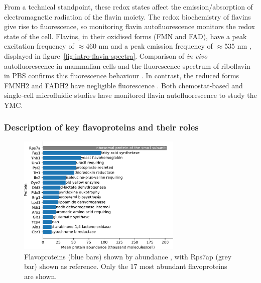 From a technical standpoint, these redox states affect the emission/absorption of electromagnetic radiation of the flavin moiety.
The redox biochemistry of flavins give rise to fluorescence, so monitoring flavin autofluorescence monitors the redox state of the cell.
Flavins, in their oxidised forms (FMN and FAD), have a peak excitation frequency of $\approx$460 nm and a peak emission frequency of $\approx$535 nm \parencite{maslankaAutofluorescenceYeastSaccharomyces2018, wagnieresVivoFluorescenceSpectroscopy1998}, displayed in figure~\ref{fig:intro-flavin-spectra}.
Comparison of \emph{in vivo} autofluorescence in mammalian cells and the fluorescence spectrum of riboflavin in PBS confirms this fluorescence behaviour \parencite{aubinAutofluorescenceViableCultured1979}.
In contrast, the reduced forms FMNH2 and FADH2 have negligible fluorescence \parencite{mastersConfocalRedoxImaging1994}.
Both chemostat-based \parencite{sasidharanTimeStructureYeastMetabolism2012, murrayRedoxRegulationRespiring2011} and single-cell microfluidic studies \parencite{baumgartnerFlavinbasedMetabolicCycles2018} have monitored flavin autofluorescence to study the YMC.

\subsubsection{Description of key flavoproteins and their roles}
\label{subsubsec:intro-flavin-biochem-descriptions}

\begin{figure}
  \centering
  \includegraphics[width=0.7\textwidth]{flavoprotein_abundance_bar}
  \caption{
    Flavoproteins (blue bars) shown by abundance \citep{hoUnificationProteinAbundance2018}, with Rps7ap (grey bar) shown as reference.
    Only the 17 most abundant flavoproteins are shown.
    }
  \label{fig:intro-flavoprotein-abundance}
\end{figure}

